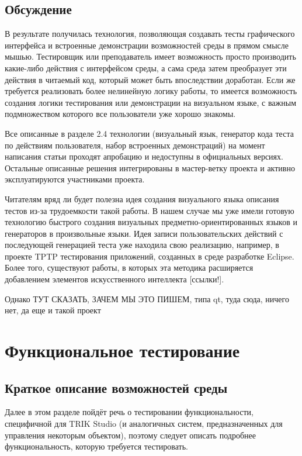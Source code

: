 \documentclass[conference]{IEEEtran}
\begin{document}
\subsection{Обсуждение}
В результате получилась технология, позволяющая создавать тесты графического интерфейса 
и встроенные демонстрации возможностей среды в прямом смысле мышью. Тестировщик или 
преподаватель имеет возможность просто производить какие-либо действия с интерфейсом 
среды, а сама среда затем преобразует эти действия в читаемый код, который может быть 
впоследствии  доработан. Если же требуется реализовать более нелинейную логику работы, 
то имеется возможность создания логики тестирования или демонстрации на визуальном 
языке, с важным подмножеством которого все пользователи уже хорошо знакомы.

Все описанные в разделе 2.4 технологии (визуальный язык, генератор кода теста по действиям 
пользователя, набор встроенных демонстраций) на момент написания статьи проходят апробацию 
и недоступны в официальных версиях. Остальные описанные решения интегрированы в мастер-ветку 
проекта и активно эксплуатируются участниками проекта.

Читателям вряд ли будет полезна идея создания визуального языка описания тестов из-за 
трудоемкости такой работы. В нашем случае мы уже имели готовую технологию быстрого 
создания визуальных предметно-ориентированных языков и генераторов в произвольные языки. 
Идея записи пользовательских действий с последующей генерацией теста уже находила 
свою реализацию, например, в проекте TPTP тестирования приложений, созданных в среде 
разработке Eclipse. Более того, существуют работы, в которых эта методика расширяется 
добавлением элементов искусственного интеллекта [ссылки!].

Однако {ТУТ СКАЗАТЬ, ЗАЧЕМ МЫ ЭТО ПИШЕМ, типа qt, туда сюда, ничего нет, да еще и такой проект}

\section{Функциональное тестирование}
\subsection{Краткое описание возможностей среды}
Далее в этом разделе пойдёт речь о тестировании функциональности, специфичной для 
TRIK Studio (и аналогичных систем, предназначенных для управления некоторым объектом), 
поэтому следует описать подробнее функциональность, которую требуется тестировать. 
\end{document}
